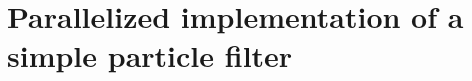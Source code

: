 \appendix

\section{Parallelized implementation of a simple particle filter}
\label{app:Parllelized implementation of a simple particle filter}

